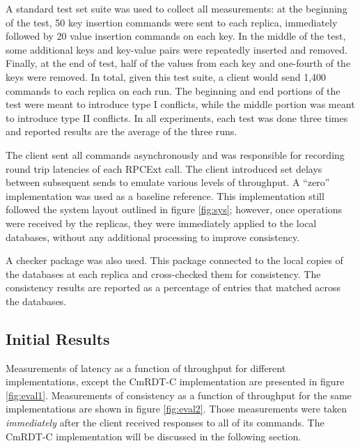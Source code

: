 \documentclass[sigconf,nonacm,10pt]{acmart}
\begin{document}
A standard test set suite was used to collect all measurements: at the beginning of the test, 50 key insertion commands were sent to each replica, immediately followed by 20 value insertion commands on each key. In the middle of the test, some additional keys and key-value pairs were repeatedly inserted and removed. Finally, at the end of test, half of the values from each key and one-fourth of the keys were removed. In total, given this test suite, a client would send 1,400 commands to each replica on each run. The beginning and end portions of the test were meant to introduce type I conflicts, while the middle portion was meant to introduce type II conflicts. In all experiments, each test was done three times and reported results are the average of the three runs.

The client sent all commands asynchronously and was responsible for recording round trip latencies of each RPCExt call. The client introduced set delays between subsequent sends to emulate various levels of throughput. A ``zero'' implementation was used as a baseline reference. This implementation still followed the system layout outlined in figure \ref{fig:sys}; however, once operations were received by the replicas, they were immediately applied to the local databases, without any additional processing to improve consistency.

A checker package was also used. This package connected to the local copies of the databases at each replica and cross-checked them for consistency. The consistency results are reported as a percentage of entries that matched across the databases.

\subsection{Initial Results}
Measurements of latency as a function of throughput for different implementations, except the CmRDT-C implementation are presented in figure \ref{fig:eval1}. Measurements of consistency as a function of throughput for the same implementations are shown in figure \ref{fig:eval2}. Those measurements were taken \emph{immediately} after the client received responses to all of its commands. The CmRDT-C implementation will be discussed in the following section.
\end{document}
